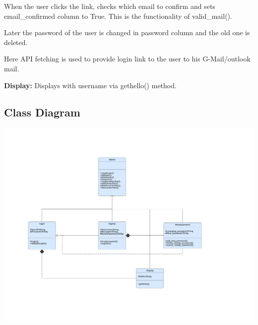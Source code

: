 \documentclass[11pt, english]{article}
\begin{document}
\item\item When the user clicks the link, checks which email to confirm and sets email_confirmed column to True. This is the functionality of valid_mail().
\item\item Later the password of the user is changed in password column and the old one is deleted.
\item\item Here API fetching is used to provide login link to the user to his G-Mail/outlook mail.
\newline
\item\textbf{Display:}
\newline
\newline Displays with username via gethello() method.

\subsection{Class Diagram}

\includegraphics[width=200mm,scale=5.0]{ClassDiagram.png}
\end{document}
